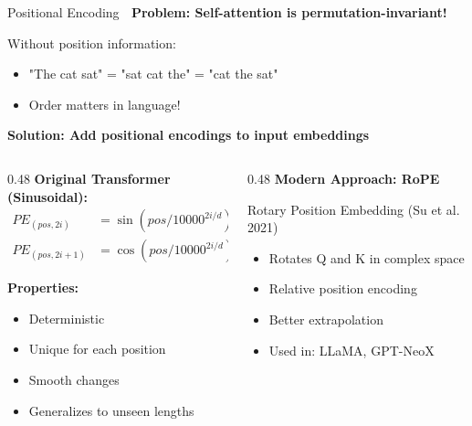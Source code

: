\documentclass[aspectratio=169]{beamer}
\begin{document}
\begin{frame}[shrink=10]{Positional Encoding 📍}
\textbf{Problem: Self-attention is permutation-invariant!}

\vspace{0.5em}

Without position information:
\begin{itemize}\setlength{\itemsep}{0pt}
    \item "The cat sat" = "sat cat the" = "cat the sat"
    \item Order matters in language!
\end{itemize}

\vspace{1em}

\textbf{Solution: Add positional encodings to input embeddings}

\vspace{1em}

\begin{columns}[T]
\begin{column}{0.48\textwidth}
\textbf{Original Transformer (Sinusoidal):}
\begin{align*}
PE_{(pos, 2i)} &= \sin(pos / 10000^{2i/d}) \\
PE_{(pos, 2i+1)} &= \cos(pos / 10000^{2i/d})
\end{align*}

\textbf{Properties:}
\begin{itemize}\setlength{\itemsep}{0pt}
    \item Deterministic
    \item Unique for each position
    \item Smooth changes
    \item Generalizes to unseen lengths
\end{itemize}
\end{column}

\begin{column}{0.48\textwidth}
\textbf{Modern Approach: RoPE}

Rotary Position Embedding (Su et al. 2021)
\begin{itemize}\setlength{\itemsep}{0pt}
    \item Rotates Q and K in complex space
    \item Relative position encoding
    \item Better extrapolation
    \item Used in: LLaMA, GPT-NeoX
\end{itemize}


\end{column}
\end{columns}
\end{frame}
\end{document}
